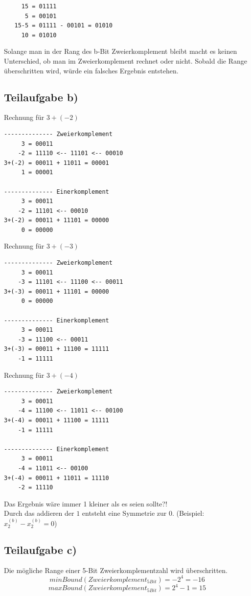 \documentclass{llncs}
\begin{document}
\begin{verbatim}
     15 = 01111
      5 = 00101
   15-5 = 01111 - 00101 = 01010
     10 = 01010
\end{verbatim}
Solange man in der Rang des b-Bit Zweierkomplement bleibt macht es keinen Unterschied, ob man im Zweierkomplement rechnet oder nicht. Sobald die Range \"uberschritten wird, w\"urde ein falsches Ergebnis entstehen.


\subsection*{Teilaufgabe b)}

Rechnung f\"ur $3+(-2)$
\begin{verbatim}
-------------- Zweierkomplement
     3 = 00011
    -2 = 11110 <-- 11101 <-- 00010
3+(-2) = 00011 + 11011 = 00001
     1 = 00001
     
-------------- Einerkomplement
     3 = 00011
    -2 = 11101 <-- 00010
3+(-2) = 00011 + 11101 = 00000
     0 = 00000
\end{verbatim}
Rechnung f\"ur $3+(-3)$
\begin{verbatim}
-------------- Zweierkomplement
     3 = 00011
    -3 = 11101 <-- 11100 <-- 00011
3+(-3) = 00011 + 11101 = 00000
     0 = 00000

-------------- Einerkomplement
     3 = 00011
    -3 = 11100 <-- 00011
3+(-3) = 00011 + 11100 = 11111
    -1 = 11111
\end{verbatim}
Rechnung f\"ur $3+(-4)$
\begin{verbatim}
-------------- Zweierkomplement
     3 = 00011
    -4 = 11100 <-- 11011 <-- 00100
3+(-4) = 00011 + 11100 = 11111
    -1 = 11111
    
-------------- Einerkomplement
     3 = 00011
    -4 = 11011 <-- 00100
3+(-4) = 00011 + 11011 = 11110
    -2 = 11110
\end{verbatim}
Das Ergebnis w\"are immer 1 kleiner als es seien sollte?!\\
Durch das addieren der $1$ entsteht eine Symmetrie zur $0$. (Beispiel: $x_2^{(b)} - x_2^{(b)} = 0$)

\subsection*{Teilaufgabe c)}

Die m\"ogliche Range einer 5-Bit Zweierkomplementzahl wird \"uberschritten.\\
$$minBound(Zweierkomplement_{5 Bit}) = -2^{4} = -16$$
$$maxBound(Zweierkomplement_{5 Bit}) = 2^{4} -1 = 15$$
\end{document}
